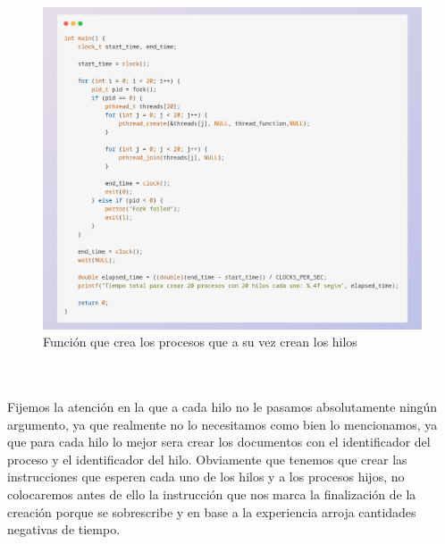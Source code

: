 \documentclass[10pt]{article}
\begin{document}
	\begin{figure}[h!]
		\centering
		\includegraphics[width=\linewidth]{pvh3.png}
		\caption{Función que crea los procesos que a su vez crean los hilos }
		\label{fig:pvh3}
	\end{figure}
	\\\\
	Fijemos la atención en la que a cada hilo no le pasamos absolutamente ningún argumento, ya que realmente no lo necesitamos como bien lo mencionamos, ya que para cada hilo lo mejor sera crear los documentos con el identificador del proceso y el identificador del hilo. Obviamente que tenemos que crear las instrucciones que esperen cada uno de los hilos y a los procesos hijos, no colocaremos antes de ello la instrucción que nos marca la finalización de la creación porque se sobrescribe y en base a la experiencia arroja cantidades negativas de tiempo.
	\newpage
\end{document}
